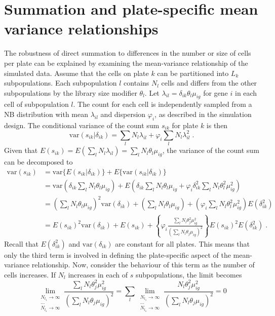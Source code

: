 \documentclass{article}
\begin{document}
\section{Summation and plate-specific mean variance relationships}
The robustness of direct summation to differences in the number or size of cells per plate can be explained by examining the mean-variance relationship of the simulated data.
Assume that the cells on plate $k$ can be partitioned into $L_k$ subpopulations.
Each subpopulation $l$ contains $N_l$ cells and differs from the other subpopulations by the library size modifier $\theta_l$.
Let $\lambda_{il} = \delta_{ik}\theta_{l}\mu_{ig}$ for gene $i$ in each cell of subpopulation $l$.
The count for each cell is independently sampled from a NB distribution with mean $\lambda_{il}$ and dispersion $\varphi_i$, as described in the simulation design.
The conditional variance of the count sum $s_{ik}$ for plate $k$ is then
\[
    \mbox{var}(s_{ik} | \delta_{ik}) = \sum_{l} N_l \lambda_{il}  + \varphi_{i} \sum_{l} N_l \lambda_{il}^2 \;.
\]
Given that $E(s_{ik}) = E(\sum_l N_l\lambda_{il}) = \sum_l N_l \theta_l \mu_{ig}$, the variance of the count sum can be decomposed to
\begin{align*}
    \mbox{var}(s_{ik}) 
    &= \mbox{var}\{E(s_{ik} | \delta_{ik} ) \} + E\{ \mbox{var}(s_{ik} | \delta_{ik}) \}\\
    &= \mbox{var}\left(\delta_{ik}\sum_l N_l \theta_{l}\mu_{ig}\right) + E\left(\delta_{ik}\sum_l  N_l\theta_l\mu_{ig}  + \varphi_{i} \delta_{ik}^2 \sum_l  N_l\theta_l^2\mu_{ig}^2\right)\\
    &= \left(\sum_l N_l \theta_{l}\mu_{ig} \right)^2 \mbox{var}(\delta_{ik}) + \left(\sum_l N_l \theta_{l}\mu_{ig}\right) + \left( \varphi_i \sum_l  N_l\theta_l^2\mu_{ig}^2 \right) E(\delta_{ik}^2) \\
    &= E(s_{ik})^2 \mbox{var}(\delta_{ik}) + E(s_{ik}) + \left\{ \varphi_i \frac{\sum_l N_l \theta_j^2\mu_{ig}^2}{ (\sum_l N_l \theta_j\mu_{ig})^2}  \right\} E(s_{ik})^2 E(\delta_{ik}^2) \;. 
\end{align*}
Recall that $E(\delta_{ik}^2)$ and $\mbox{var}(\delta_{ik})$ are constant for all plates.
This means that only the third term is involved in defining the plate-specific aspect of the mean-variance relationship.
Now, consider the behaviour of this term as the number of cells increases.
If $N_l$ increases in each of $s$ subpopulations, the limit becomes
\[
    \lim_{\substack{N_{l_1} \to \infty \\ \dots \\ N_{l_s} \to \infty}} \frac{\sum_l N_l \theta_j^2\mu_{ig}^2}{ (\sum_l N_l \theta_j\mu_{ig})^2} 
    = \sum_l \lim_{\substack{N_{l_1} \to \infty \\ \dots \\ N_{l_s} \to \infty}} \frac{N_l \theta_j^2\mu_{ig}^2}{ (\sum_l N_l \theta_j\mu_{ig})^2} 
= 0
\]
\end{document}
